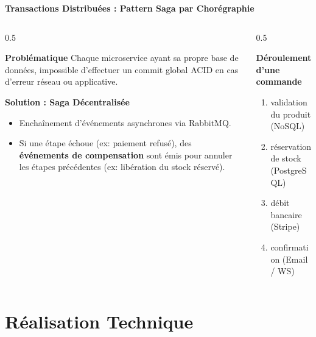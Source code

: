 \documentclass[10pt,aspectratio=169]{beamer}
\begin{document}
\begin{frame}{\textbf{Transactions Distribuées : Pattern Saga par Chorégraphie}}
    \begin{columns}
        \begin{column}{0.5\textwidth}
            \begin{block}{\textbf{Problématique}}
                Chaque microservice ayant sa propre base de données, impossible d'effectuer un commit global ACID en cas d'erreur réseau ou applicative.
            \end{block}
            \begin{block}{\textbf{Solution : Saga Décentralisée}}
                \begin{itemize}
                    \item Enchaînement d'événements asynchrones via RabbitMQ.
                    \item Si une étape échoue (ex: paiement refusé), des \textbf{événements de compensation} sont émis pour annuler les étapes précédentes (ex: libération du stock réservé).
                \end{itemize}
            \end{block}
        \end{column}
        \begin{column}{0.5\textwidth}
            \begin{exampleblock}{\textbf{Déroulement d'une commande}}
                \begin{enumerate}
                    \item validation du produit (NoSQL)
                    \item réservation de stock (PostgreSQL)
                    \item débit bancaire (Stripe)
                    \item confirmation (Email / WS)
                \end{enumerate}
            \end{exampleblock}
        \end{column}
    \end{columns}
\end{frame}

\section{Réalisation Technique}
\end{document}
